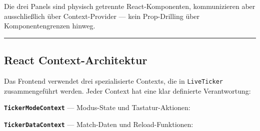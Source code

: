 Die drei Panels sind physisch getrennte React-Komponenten, kommunizieren
aber ausschließlich über Context-Provider --- kein Prop-Drilling über
Komponentengrenzen hinweg.

\begin{center}\rule{0.5\linewidth}{0.5pt}\end{center}

\subsection{React
Context-Architektur}\label{react-context-architektur}

Das Frontend verwendet drei spezialisierte Contexts, die in
\texttt{LiveTicker} zusammengeführt werden. Jeder Context hat eine klar
definierte Verantwortung:

\textbf{\texttt{TickerModeContext}} --- Modus-State und
Tastatur-Aktionen:

\begin{Shaded}
\begin{Highlighting}[]
\OperatorTok{:}\OperatorTok{;} 
\OperatorTok{:}\OperatorTok{:}\KeywordTok{=\textgreater{}} \OperatorTok{;}
\OperatorTok{:}\NormalTok{ () }\KeywordTok{=\textgreater{}} \OperatorTok{\textless{}}\OperatorTok{\textgreater{};} 
\OperatorTok{:}\NormalTok{ () }\KeywordTok{=\textgreater{}} \OperatorTok{\textless{}}\OperatorTok{\textgreater{};} 
\NormalTok{\}}
\end{Highlighting}
\end{Shaded}

\textbf{\texttt{TickerDataContext}} --- Match-Daten und
Reload-Funktionen:

\begin{Shaded}
\begin{Highlighting}[]
\OperatorTok{:}\OperatorTok{|} \OperatorTok{;}
\OperatorTok{:}\OperatorTok{;}
\OperatorTok{:}\OperatorTok{;}
\OperatorTok{:}\OperatorTok{;}
\OperatorTok{:}\OperatorTok{;}
\OperatorTok{:}\OperatorTok{;}
\OperatorTok{:}\OperatorTok{;}
\OperatorTok{:}\OperatorTok{;}
\OperatorTok{:}\OperatorTok{;}
\OperatorTok{:}\OperatorTok{;}
\OperatorTok{:}  \OperatorTok{|} \OperatorTok{;}
\NormalTok{\}}
\end{Highlighting}
\end{Shaded}

